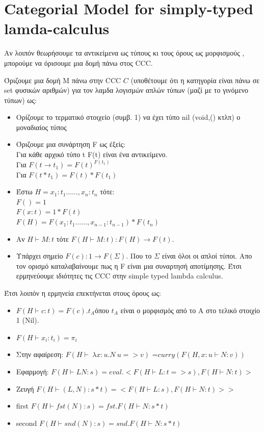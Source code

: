 \documentclass{article}
\begin{document}
\section*{Categorial Model for simply-typed lamda-calculus}

Αν λοιπόν θεωρήσουμε τα αντικείμενα ως τύπους κι τους όρους ως μορφισμούς , μπορούμε να όρισουμε μια δομή πάνω στος CCC.

Όριζουμε μια δομή Μ πάνω στην CCC $C$ (υποθέτουμε ότι η κατηγορία είναι πάνω σε set φυσικών αριθμών) για τον λαμδα λογισμών απλών τύπων (μαζί με το γινόμενο τύπων) ως:\\
\begin{itemize}
	\item	Ορίζουμε το τερματικό στοιχείο (συμβ. 1) να έχει τύπο nil (void,() κτλπ) ο μοναδιαίος τύπος 
	\item Όριζουμε μια συνάρτηση F ως έξείς: \\
		Για κάθε αρχικό τύπο t F(t) είναι ένα αντικείμενο.\\
		Για $F(t\rightarrow t_1) = F(t)^{F(t_1)} $\\
		Για $F(t*t_1) = F(t)*F(t_1) $
	\item Έστω $H= x_1 :t_1 \dots \dots ,x_n:t_n$ τότε:\\
		$F()=1$\\
		$F(x:t)=1*F(t)$\\
		$F(H)=F(x_1:t_1 \dots\dots,x_{n-1}:t_{n-1})*F(t_n)$
\item Αν $H \vdash M:t$ τότε $F(H \vdash M:t): F(H) \rightarrow F(t)$.
\item 
	Υπάρχει σημείο $F(c):1 \rightarrow F(\Sigma)$. Που το $\Sigma$ είναι όλοι οι απλοί τύποι.
Απο τον ορισμό καταλαβαίνουμε πως η F είναι μια συναρτησή αποτίμησης. Έτσι ερμηνεύουμε ιδιότητες τις CCC στην simple typed lambda calculus.
\end{itemize}
Έτσι λοιπόν η ερμηνεία επεκτήνεται στους όρους ως:
\begin{itemize}
	\item $F(H \vdash c:t) =F(c).t_A$όπου $t_A$ είναι ο μορφισμός από το Α στο τελικό στοιχίο 1 (Nil).
	\item $F(H \vdash x_i : t_i)=\pi_i$
	\item Στην αφαίρεση: $F(H \vdash \ \lambda x : u . N \: u => v)$ =$ curry(F(H , x : u \vdash N : v))$
	\item Εφαρμογή: $F(H \vdash LN:s) = eval . <F(H\vdash L: t=>s),F(H \vdash N:t)>$
	\item Ζευγή $F(H \vdash (L,N): s*t)=<F(H\vdash L:s),F(H \vdash N:t)>>$
	\item first $F(H \vdash fst(N):s)=fst . F(H \vdash N : s*t)$
	\item second $F(H \vdash snd(N):s)=snd . F(H \vdash N : s*t)$
\end{itemize}
\end{document}
